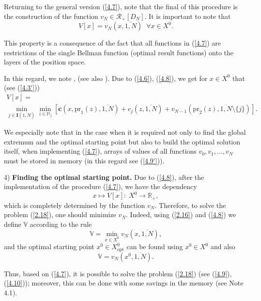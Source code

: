 Returning to the general version (\ref{4.7}),
note that the final of this procedure is the construction of the function
$v_N \in \mathcal{R}_+[D_N]$.
It is important to note that
\begin{equation}\label{4.8}
  V[x] = v_N(x,\overline{1,N})\;\;\forall{x} \in X^0.
\end{equation}

This property is a consequence of the fact
that all functions in
 (\ref{4.7}) are restrictions of the single Bellman function
(optimal result functions)
onto the layers of the position space.

In this regard, we note
\cite[$\S$4.9]{14}, \cite{18}
(see also \cite[(4.3.1)]{4}).
Due to (\ref{4.6}), (\ref{4.8}),
we get for
$x \in X^0$
that
(see (\ref{4.3'}))
\begin{multline}
  \label{4.9'}
  V[x] = \\
  \min\limits_{j \in \mathbf{I}(\overline{1,N})} \min\limits_{z \in \mathbb{M}_j}
  [\mathbf{c}(x,\mathrm{pr}_1(z),\overline{1,N}) + c_j(z,\overline{1,N}) + v_{N-1}(\mathrm{pr}_2(z),\overline{1,N} \setminus \{j\})].
\end{multline}

We especially note that in the case
when it is required not only to find the global extremum
and the optimal starting point
but also to build the optimal solution itself,
when implementing (\ref{4.7}),
arrays of values of all functions
$v_0,v_1,...,v_N$
must be stored in memory
(in this regard see (\ref{4.9'})).

4) {\bf Finding the optimal starting point.}
Due to
 (\ref{4.8}),
after the implementation of the procedure
 (\ref{4.7}), we have the dependency
$$
  x \longmapsto V[x]:\;X^0 \longrightarrow \mathbb{R}_+,
$$
which is completely determined by the function
$v_N$.
Therefore, to solve the problem (\ref{2.18}), one should minimize
$v_N$.
Indeed,
using (\ref{2.16}) and (\ref{4.8})
we define
$\mathbb{V}$
according to the rule
\begin{equation}\label{4.9}
  \mathbb{V} = \min\limits_{x \in X^0} v_N(x,\overline{1,N}),
\end{equation}
and the optimal starting point
$x^0 \in X^0_{\mathrm{opt}}$
can be found using
$x^0 \in X^0$ and also
\begin{equation}\label{4.10}
  \mathbb{V} = v_N(x^0,\overline{1,N}).
\end{equation}

Thus,
based on (\ref{4.7}),
it is possible to
solve the problem (\ref{2.18})
(see (\ref{4.9}), (\ref{4.10}));
moreover,
this can be done with some savings in the memory
(see Note 4.1).

